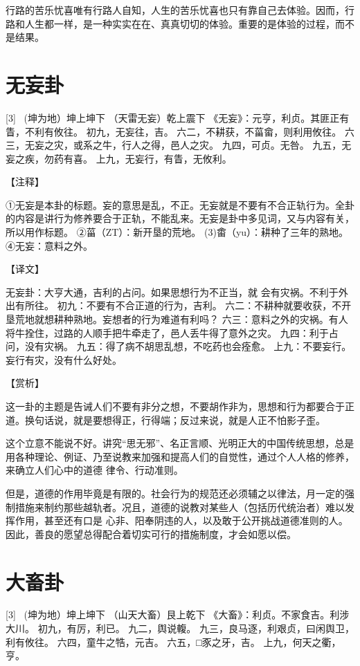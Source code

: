 \documentclass[12pt,UTF8]{ctexbook}
\begin{document}
行路的苦乐忧喜唯有行路人自知，人生的苦乐忧喜也只有靠自己去体验。因而，行路和人生都一样，是一种实实在在、真真切切的体验。重要的是体验的过程，而不是结果。

\chapter{无妄卦}
[3] \ (坤为地）坤上坤下
（天雷无妄）乾上震下
《无妄》：元亨，利贞。其匪正有眚，不利有攸往。
初九，无妄往，吉。
六二，不耕获，不菑畲，则利用攸往。
六三，无妄之灾，或系之牛，行人之得，邑人之灾。
九四，可贞。无咎。
九五，无妄之疾，勿药有喜。
上九，无妄行，有眚，无攸利。

【注释】

①无妄是本卦的标题。妄的意思是乱，不正。无妄就是不要有不合正轨行为。全卦的内容是讲行为修养要合于正轨，不能乱来。无妄是卦中多见词，又与内容有关，所以用作标题。
②菑（ZT）：新开垦的荒地。
(3)畬（yu）：耕种了三年的熟地。
④无妄：意料之外。

【译文】

无妄卦：大亨大通，吉利的占问。如果思想行为不正当，就 会有灾祸。不利于外出有所往。
初九：不要有不合正道的行为，吉利。
六二：不耕种就要收获，不开垦荒地就想耕种熟地。妄想者的行为难道有利吗？
六三：意料之外的灾祸。有人将牛拴住，过路的人顺手把牛牵走了，邑人丢牛得了意外之灾。
九四：利于占问，没有灾祸。
九五：得了病不胡思乱想，不吃药也会痊愈。
上九：不要妄行。妄行有灾，没有什么好处。

【赏析】

这一卦的主题是告诫人们不要有非分之想，不要胡作非为，思想和行为都要合于正道。换句话说，就是要想得正，行得端；反过来说，就是人正不怕影子歪。

这个立意不能说不好。讲究“思无邪”、名正言顺、光明正大的中国传统思想，总是用各种理论、例证、乃至说教来加强和提高人们的自觉性，通过个人人格的修养，来确立人们心中的道德 律令、行动准则。

但是，道德的作用毕竟是有限的。社会行为的规范还必须辅之以律法，月一定的强制措施来制约那些越轨者。况且，道德的说教对某些人（包括历代统治者）难以发挥作用，甚至还有口是 心非、阳奉阴违的人，以及敢于公开挑战道德准则的人。因此，善良的愿望总得配合着切实可行的措施制度，才会如愿以偿。

\chapter{大畜卦}
[3] \ (坤为地）坤上坤下
（山天大畜）艮上乾下
《大畜》：利贞。不家食吉。利涉大川。
初九，有厉，利已。
九二，舆说輹。
九三，良马逐，利艰贞，曰闲舆卫，利有攸往。
六四，童牛之牿，元吉。
六五，□豕之牙，吉。
上九，何天之衢，亨。
\end{document}
